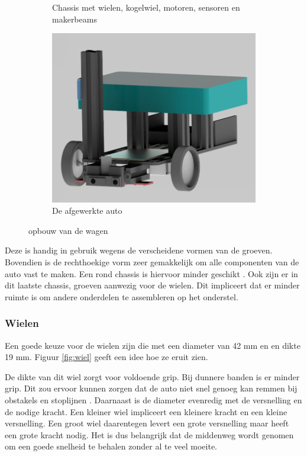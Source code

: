 \documentclass[a4paper,twoside,kulak]{kulakreport} %
\begin{document}
\begin{figure}[ht]
\begin{subfigure}[b]{0.5\linewidth}
		\caption{Chassis met wielen, kogelwiel, motoren, sensoren en makerbeams} 
		\label{opbouw3} 
	\end{subfigure}%
	\begin{subfigure}[b]{0.5\linewidth}
		\centering
		\includegraphics[width=0.75\linewidth]{4Volledig} 
		\caption{De afgewerkte auto} 
		\label{opbouw4} 
	\end{subfigure} 
	\caption{opbouw van de wagen}
	\label{opbouwvanwagen} 
\end{figure}

Deze is handig in gebruik wegens de verscheidene vormen van de groeven. %
Bovendien is de rechthoekige vorm zeer gemakkelijk om alle componenten van de auto vast te maken. Een rond chassis is hiervoor minder geschikt \cite{RobotChassis}. Ook zijn er in dit laatste chassis, groeven aanwezig voor de wielen. Dit impliceert dat er minder ruimte is om andere onderdelen te assembleren op het onderstel. %
\label{Chassis}

\subsubsection{Wielen}
Een goede keuze voor de wielen zijn die met een diameter van 42 mm en en dikte 19 mm.
Figuur \ref{fig:wiel} geeft een idee hoe ze eruit zien.

De dikte van dit wiel zorgt voor voldoende grip. Bij dunnere banden is er minder grip. Dit zou ervoor kunnen zorgen dat de auto niet snel genoeg kan remmen bij obstakels en stoplijnen \cite{Banden}.  
Daarnaast is de diameter evenredig met de versnelling en de nodige kracht. Een kleiner wiel impliceert een kleinere kracht en een kleine versnelling. Een groot wiel daarentegen levert een grote versnelling maar heeft een grote kracht nodig. Het is dus belangrijk dat de middenweg wordt genomen om een goede snelheid te behalen zonder al te veel moeite.    
\end{document}
